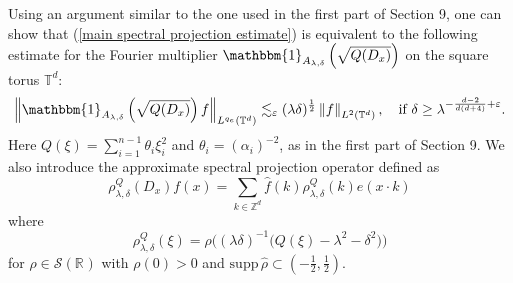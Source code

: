 \documentclass[11pt]{amsart}
\numberwithin{equation}{section}
\newcommand{\la}{\lambda}
\newcommand\norm[1]{\left\lVert#1\right\rVert}
\newcommand{\lpnorm}[3]{\norm{#1}_{L^{#2}(#3)}}
\newcommand{\supp}[1]{\text{supp}\, #1}
\newcommand{\R}[1][]{\mathbb{R}^#1}
\newcommand{\Z}[1][]{\mathbb{Z}^#1}
\newcommand{\T}[1][]{\mathbb{T}^#1}
\begin{document}
Using an argument similar to the one used in the first part of Section 9, one can show that (\ref{main spectral projection estimate}) is equivalent to the following estimate for the Fourier multiplier $\mathbbm{1}_{A_{\la, \delta}}\left(\sqrt{Q(D_x)}\right)$ on the square torus $\T{d}$:
\begin{equation} \label{spectral projection estimate for Q}
    \lpnorm{\mathbbm{1}_{A_{\la, \delta}}\left(\sqrt{Q(D_x)}\right)f}{q_e}{\T{d}} \lesssim_{\varepsilon} (\la\delta)^{\frac{1}{2}}\lpnorm{f}{2}{\T{d}}, \ \ \ \text{if} \ \delta \geq \la^{-\frac{d-2}{d(d+4)} + \varepsilon}.
\end{equation}
Here $Q(\xi) = \sum_{i = 1}^{n-1}\theta_i\xi_i^2$ and $\theta_i = (\alpha_i)^{-2}$, as in the first part of Section 9. 
We also introduce the approximate spectral projection operator defined as
\begin{equation}
    \rho_{\la, \delta}^{Q}(D_x)f(x) = \sum_{k \in \Z{d}}\widehat{f}(k)\rho_{\la, \delta}^{Q}(k)e(x\cdot k)
\end{equation}
where 
\begin{equation}
    \rho_{\la, \delta}^{Q}(\xi) = \rho\big((\la\delta)^{-1}\big(Q(\xi) - \la^2 - \delta^2\big)\big)
\end{equation}
for $\rho \in \mathcal{S}(\R{})$ with $\rho(0) > 0$ and $\supp{\widehat{\rho}}\subset(-\frac{1}{2}, \frac{1}{2})$.
\end{document}
